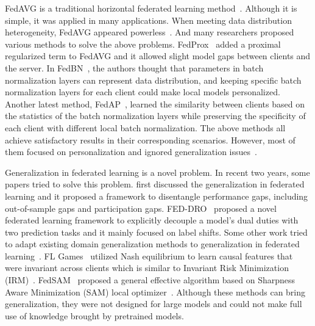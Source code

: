 FedAVG is a traditional horizontal federated learning method~\cite{mcmahan2017communication}.
Although it is simple, it was applied in many applications.
When meeting data distribution heterogeneity, FedAVG appeared powerless~\cite{sattler2019robust}.
And many researchers proposed various methods to solve the above problems.
FedProx~\cite{li2018federated} added a proximal regularized term to FedAVG and it allowed slight model gaps between clients and the server.
In FedBN~\cite{li2021fedbn}, the authors thought that parameters in batch normalization layers can represent data distribution, and keeping specific batch normalization layers for each client could make local models personalized.
Another latest method, FedAP~\cite{lu2022personalized}, learned the similarity between clients based on the statistics of the batch normalization layers while preserving the specificity of each client with different local batch normalization.
The above methods all achieve satisfactory results in their corresponding scenarios.
However, most of them focused on personalization and ignored generalization issues~\cite{chenbridging}.

Generalization in federated learning is a novel problem.
In recent two years, some papers tried to solve this problem.
\cite{Honglinyuan2022} first discussed the generalization in federated learning and it proposed a framework to disentangle performance gaps, including out-of-sample gaps and participation gaps.
FED-DRO~\cite{chenbridging} proposed a novel federated learning framework to explicitly decouple a model's dual duties with two prediction tasks and it mainly focused on label shifts.
Some other work tried to adapt existing domain generalization methods to generalization in federated learning~\cite{gupta2022fl,tenison2022gradient,qu2022generalized,caldarola2022improving}.
FL Games~\cite{gupta2022fl} utilized Nash equilibrium to learn causal features that were invariant across clients which is similar to Invariant Risk Minimization (IRM)~\cite{arjovsky2020invariant}.
FedSAM~\cite{qu2022generalized} proposed a general effective algorithm based on Sharpness Aware Minimization (SAM) local optimizer~\cite{foretsharpness}.
Although these methods can bring generalization, they were not designed for large models and could not make full use of knowledge brought by pretrained models.


